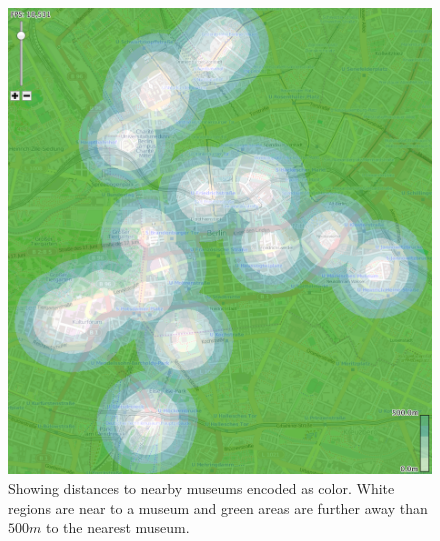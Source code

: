 \begin{figure}
        \centering
		\includegraphics[width=0.5\linewidth]{imgs/museum}
        \caption{Showing distances to nearby museums encoded as color. White regions
        are near to a museum and green areas are further away than $500m$ to the
        nearest museum.}
		\label{fig:museum}
\end{figure}
